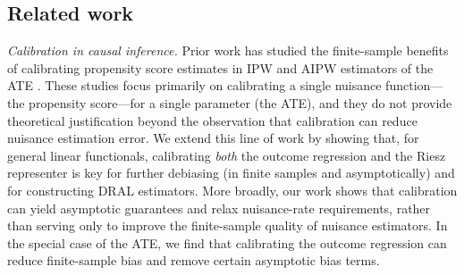 \documentclass[11pt]{article}
\theoremstyle{plain}
\begin{document}
 

  
\subsection{Related work}
 
\label{sec:relatedwork}
 

 


\medskip  \noindent \emph{Calibration in causal inference.}  Prior work has studied the finite-sample benefits of calibrating propensity score estimates in IPW and AIPW estimators of the ATE \citep{gutman2022propensity, deshpande2023calibrated, ballinari2024improving, van_der_Laan2024stabilized, rabenseifner2025calibrationstrategiesrobustcausal}. These studies focus primarily on calibrating a single nuisance function---the propensity score---for a single parameter (the ATE), and they do not provide theoretical justification beyond the observation that calibration can reduce nuisance estimation error. We extend this line of work by showing that, for general linear functionals, calibrating \emph{both} the outcome regression and the Riesz representer is key for further debiasing (in finite samples and asymptotically) and for constructing DRAL estimators. {\color{purple} More broadly, our work shows that calibration can yield asymptotic guarantees and relax nuisance-rate requirements, rather than serving only to improve the finite-sample quality of nuisance estimators. In the special case of the ATE, we find that calibrating the outcome regression can reduce finite-sample bias and remove certain asymptotic bias terms.}


 

 

 
\end{document}
